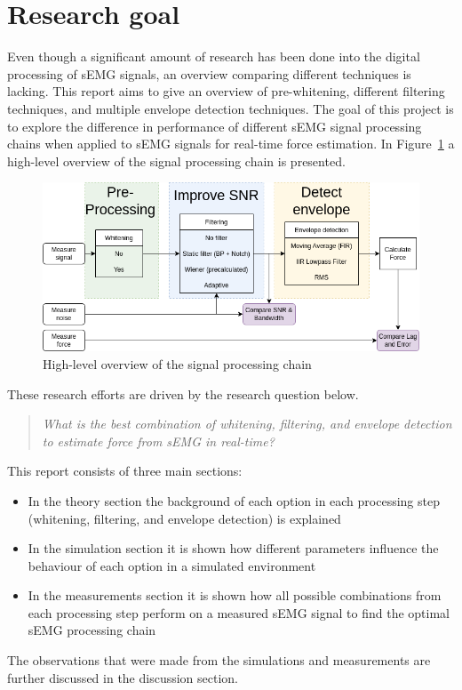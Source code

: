 \section{Research goal}
Even though a significant amount of research has been done into the digital processing of sEMG signals, an overview comparing different techniques is lacking. This report aims to give an overview of pre-whitening, different filtering techniques, and multiple envelope detection techniques. The goal of this project is to explore the difference in performance of different sEMG signal processing chains when applied to sEMG signals for real-time force estimation.
In Figure~\ref{fig:global_thesis_flowchart} a high-level overview of the signal processing chain is presented. 

\begin{figure}[h!t]
	\begin{center}
		\includegraphics[width=1.0\columnwidth]{images/global_thesis_flowchart.png}
	\end{center}
	\caption{High-level overview of the signal processing chain}
	\label{fig:global_thesis_flowchart}
\end{figure}

These research efforts are driven by the research question below.

\begin{quote}\emph{What is the best combination of whitening, filtering, and envelope detection to estimate force from sEMG in real-time? }\end{quote}

This report consists of three main sections:
\begin{itemize}
    \item In the theory section the background of each option in each processing step (whitening, filtering, and envelope detection) is explained
    \item In the simulation section it is shown how different parameters influence the behaviour of each option in a simulated environment
    \item In the measurements section it is shown how all possible combinations from each processing step perform on a measured sEMG signal to find the optimal sEMG processing chain
\end{itemize}
The observations that were made from the simulations and measurements are further discussed in the discussion section.

